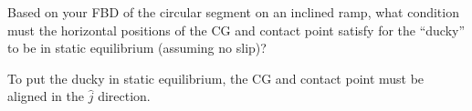 Based on your FBD of the circular segment on an inclined ramp, what condition must the horizontal positions of the CG and contact point satisfy for the “ducky” to be in static equilibrium (assuming no slip)?

\begin{solution}
    To put the ducky in static equilibrium, the CG and contact point must be aligned in the $\hat{j}$ direction.
\end{solution}